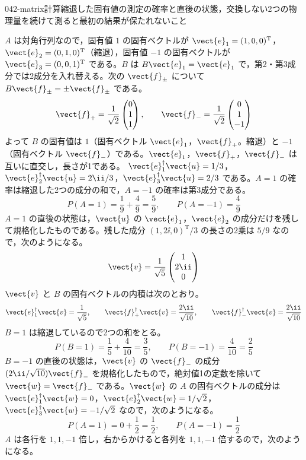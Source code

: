 \documentclass[uplatex,dvipdfmx,a4paper,11pt]{jsarticle}
\begin{document}
\begin{mondai}{042-matrix}{計算}{縮退した固有値の測定の確率と直後の状態，交換しない2つの物理量を続けて測ると最初の結果が保たれないこと}
\begin{tadashii}
 $A$ は対角行列なので，固有値 $1$ の固有ベクトルが $\vect{e}_{1}=(1,0,0)^{\mathrm{T}}$，$\vect{e}_{2}=(0,1,0)^{\mathrm{T}}$（縮退），固有値 $-1$ の固有ベクトルが $\vect{e}_{3}=(0,0,1)^{\mathrm{T}}$ である。$B$ は $B\vect{e}_{1}=\vect{e}_{1}$ で，第2・第3成分では2成分を入れ替える。次の $\vect{f}_{\pm}$ について $B\vect{f}_{\pm}=\pm\vect{f}_{\pm}$ である。
\[ \vect{f}_{+}=\frac{1}{\sqrt{2}}\begin{pmatrix}0\\1\\1\end{pmatrix},\qquad \vect{f}_{-}=\frac{1}{\sqrt{2}}\begin{pmatrix}0\\1\\-1\end{pmatrix} \]
よって $B$ の固有値は $1$（固有ベクトル $\vect{e}_{1}$，$\vect{f}_{+}$。縮退）と $-1$（固有ベクトル $\vect{f}_{-}$）である。$\vect{e}_{1}$，$\vect{f}_{+}$，$\vect{f}_{-}$ は互いに直交し，長さが1である。
 $\vect{e}_{1}^{\dagger}\vect{u}=1/3$，$\vect{e}_{2}^{\dagger}\vect{u}=2\ii/3$，$\vect{e}_{3}^{\dagger}\vect{u}=2/3$ である。$A=1$ の確率は縮退した2つの成分の和で，$A=-1$ の確率は第3成分である。
\[ P(A=1)=\frac{1}{9}+\frac{4}{9}=\frac{5}{9},\qquad P(A=-1)=\frac{4}{9} \]
$A=1$ の直後の状態は，$\vect{u}$ の $\vect{e}_{1}$，$\vect{e}_{2}$ の成分だけを残して規格化したものである。残した成分 $(1,2\ii,0)^{\mathrm{T}}/3$ の長さの2乗は $5/9$ なので，次のようになる。
\[ \vect{v}=\frac{1}{\sqrt{5}}\begin{pmatrix}1\\2\ii\\0\end{pmatrix} \]
 $\vect{v}$ と $B$ の固有ベクトルの内積は次のとおり。
\[ \vect{e}_{1}^{\dagger}\vect{v}=\frac{1}{\sqrt{5}},\qquad \vect{f}_{+}^{\dagger}\vect{v}=\frac{2\ii}{\sqrt{10}},\qquad \vect{f}_{-}^{\dagger}\vect{v}=\frac{2\ii}{\sqrt{10}} \]
$B=1$ は縮退しているので2つの和をとる。
\[ P(B=1)=\frac{1}{5}+\frac{4}{10}=\frac{3}{5},\qquad P(B=-1)=\frac{4}{10}=\frac{2}{5} \]
$B=-1$ の直後の状態は，$\vect{v}$ の $\vect{f}_{-}$ の成分 $(2\ii/\sqrt{10})\vect{f}_{-}$ を規格化したもので，絶対値1の定数を除いて $\vect{w}=\vect{f}_{-}$ である。$\vect{w}$ の $A$ の固有ベクトルの成分は $\vect{e}_{1}^{\dagger}\vect{w}=0$，$\vect{e}_{2}^{\dagger}\vect{w}=1/\sqrt{2}$，$\vect{e}_{3}^{\dagger}\vect{w}=-1/\sqrt{2}$ なので，次のようになる。
\[ P(A=1)=0+\frac{1}{2}=\frac{1}{2},\qquad P(A=-1)=\frac{1}{2} \]
 $A$ は各行を $1,1,-1$ 倍し，右からかけると各列を $1,1,-1$ 倍するので，次のようになる。

\end{tadashii}
\end{mondai}
\end{document}

